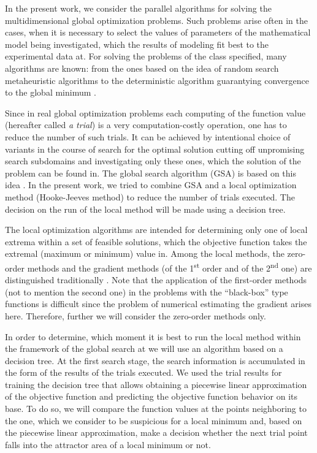 \documentclass{svproc}
\begin{document}
In the present work, we consider the parallel algorithms for solving the multidimensional global  optimization problems. Such problems arise often in the cases, when it is necessary to select the values  of parameters of the mathematical model being investigated, which the results of modeling fit best to  the experimental data at. For solving the problems of the class specified, many algorithms are known: from the ones based on the  idea of random search \cite{fio_bib1, fio_bib2, fio_bib3} metaheuristic algorithms to the deterministic  algorithm guarantying convergence to the global minimum \cite{fio_bib4, fio_bib5, fio_bib6}.  

Since in real global optimization problems each computing of the function value (hereafter called  \textit{a trial}) is a very computation-costly operation, one has to reduce the number of such trials. It  can be achieved by intentional choice of variants in the course of search for the optimal solution cutting  off unpromising search subdomains and investigating only these ones, which the solution of the  problem can be found in. The global search algorithm (GSA) is based on this idea \cite{fio_bib7}. In  the present work, we tried to combine GSA and a local optimization method (Hooke-Jeeves method)  to reduce the number of trials executed. The decision on the run of the local method will be made using  a decision tree.

The local optimization algorithms are intended for determining only one of local extrema within a set  of feasible solutions, which the objective function takes the extremal (maximum or minimum) value in.  Among the local methods,  the zero-order methods and the gradient methods (of the 1\textsuperscript{st} order and of the  2\textsuperscript{nd} one) are distinguished traditionally \cite{fio_bib8,fio_bib9}. Note that the application of the first-order methods (not to mention the second one) in the problems  with the “black-box” type functions is difficult since the problem of numerical estimating the gradient  arises here. Therefore, further we will consider the zero-order methods only. 

In order to determine, which moment it is best to run the local method within the framework of the  global search at we will use an algorithm based on a decision tree. At the first search stage, the search information is accumulated in the form of the results of the trials  executed. We used the trial results for training the decision tree that allows obtaining a piecewise linear  approximation of the objective function and predicting the objective function behavior on its base.  To do so, we will compare the function values at the points neighboring to the one, which we consider  to be suspicious for a local minimum and, based on the piecewise linear approximation, make a decision  whether the next trial point falls into the attractor area of a local minimum  or not.
\end{document}
